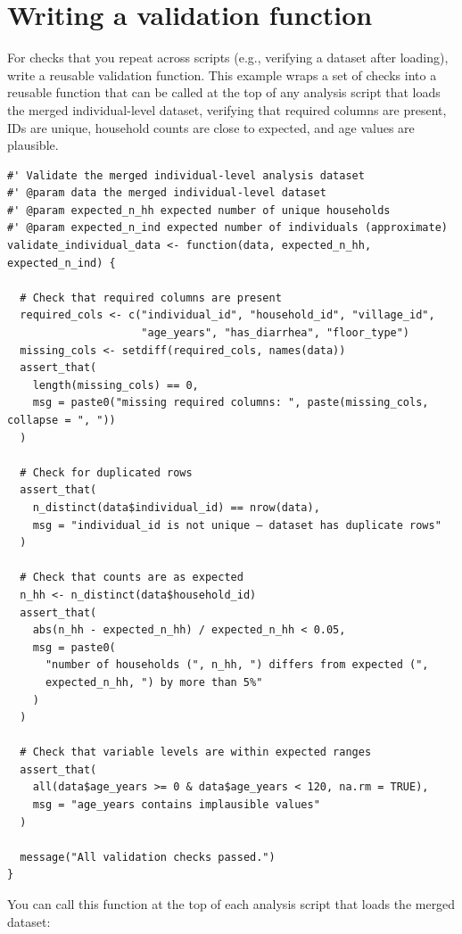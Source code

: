 \documentclass[
]{book}
\begin{document}
\section{Writing a validation function}\label{writing-a-validation-function}

For checks that you repeat across scripts (e.g., verifying a dataset after loading), write a reusable validation function. This example wraps a set of checks into a reusable function that can be called at the top of any analysis script that loads the merged individual-level dataset, verifying that required columns are present, IDs are unique, household counts are close to expected, and age values are plausible.

\begin{verbatim}
#' Validate the merged individual-level analysis dataset
#' @param data the merged individual-level dataset
#' @param expected_n_hh expected number of unique households
#' @param expected_n_ind expected number of individuals (approximate)
validate_individual_data <- function(data, expected_n_hh, expected_n_ind) {
  
  # Check that required columns are present
  required_cols <- c("individual_id", "household_id", "village_id",
                     "age_years", "has_diarrhea", "floor_type")
  missing_cols <- setdiff(required_cols, names(data))
  assert_that(
    length(missing_cols) == 0,
    msg = paste0("missing required columns: ", paste(missing_cols, collapse = ", "))
  )
  
  # Check for duplicated rows
  assert_that(
    n_distinct(data$individual_id) == nrow(data),
    msg = "individual_id is not unique — dataset has duplicate rows"
  )
  
  # Check that counts are as expected 
  n_hh <- n_distinct(data$household_id)
  assert_that(
    abs(n_hh - expected_n_hh) / expected_n_hh < 0.05,
    msg = paste0(
      "number of households (", n_hh, ") differs from expected (",
      expected_n_hh, ") by more than 5%"
    )
  )
  
  # Check that variable levels are within expected ranges 
  assert_that(
    all(data$age_years >= 0 & data$age_years < 120, na.rm = TRUE),
    msg = "age_years contains implausible values"
  )
  
  message("All validation checks passed.")
}
\end{verbatim}

You can call this function at the top of each analysis script that loads the merged dataset:
\end{document}
